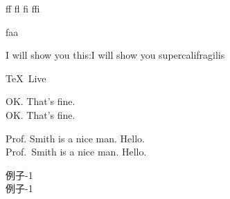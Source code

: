 \documentclass{ctexart}
\begin{document}
	
	
	ff fl f\mbox{}i ffi	
	
	f\mbox{}aa
	
	
	
	I will show you this:I will show you 
	su\-per\-cal\-i\-fr\-ag\-i\-lis\-%
	
	
	\TeX\ Live
	
	OK. That's fine. \\
	OK\@. That's fine.
	
	Prof. Smith is a nice man. Hello.\\
	Prof.~Smith is a nice man. Hello.
	
	例子-1\\
	\mbox{例子}-1
	
	
	\permil \\
	
	\male \female \\
	
	\phone
	
\end{document}
